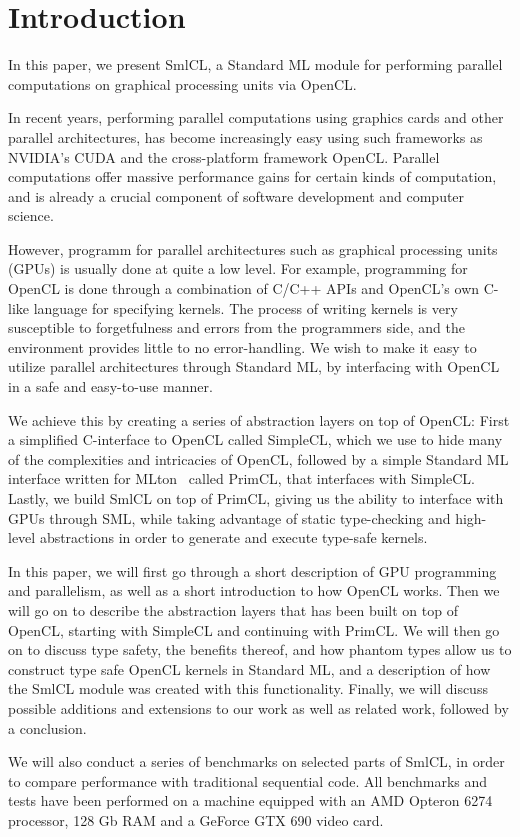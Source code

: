 \section{Introduction}

In this paper, we present SmlCL, a Standard ML module for performing
parallel computations on graphical processing units via OpenCL.

In recent years, performing parallel computations using graphics cards
and other parallel architectures, has become increasingly easy using
such frameworks as NVIDIA's CUDA and the cross-platform framework
OpenCL. Parallel computations offer massive performance gains for
certain kinds of computation, and is already a crucial component of
software development and computer science.

However, programm for parallel architectures such as graphical
processing units (GPUs) is usually done at quite a low level. For
example, programming for OpenCL is done through a combination of C/C++
APIs and OpenCL's own C-like language for specifying kernels. The
process of writing kernels is very susceptible to forgetfulness and
errors from the programmers side, and the environment provides little
to no error-handling. We wish to make it easy to utilize parallel
architectures through Standard ML, by interfacing with OpenCL in a
safe and easy-to-use manner.

We achieve this by creating a series of abstraction layers on top of
OpenCL: First a simplified C-interface to OpenCL called SimpleCL,
which we use to hide many of the complexities and intricacies of
OpenCL, followed by a simple Standard ML interface written for
MLton~\cite{mlton} called PrimCL, that interfaces with
SimpleCL. Lastly, we build SmlCL on top of PrimCL, giving us the
ability to interface with GPUs through SML, while taking advantage of
static type-checking and high-level abstractions in order to generate
and execute type-safe kernels.

In this paper, we will first go through a short description of GPU
programming and parallelism, as well as a short introduction to how
OpenCL works. Then we will go on to describe the abstraction layers
that has been built on top of OpenCL, starting with SimpleCL and
continuing with PrimCL. We will then go on to discuss type safety, the
benefits thereof, and how phantom types allow us to construct type
safe OpenCL kernels in Standard ML, and a description of how the SmlCL
module was created with this functionality. Finally, we will discuss
possible additions and extensions to our work as well as related work,
followed by a conclusion.

We will also conduct a series of benchmarks on selected parts of
SmlCL, in order to compare performance with traditional sequential
code. All benchmarks and tests have been performed on a machine
equipped with an AMD Opteron 6274 processor, 128 Gb RAM and a GeForce
GTX 690 video card.
